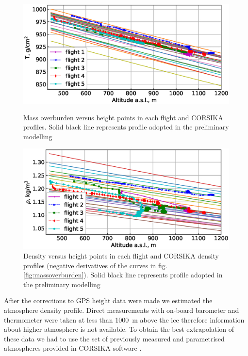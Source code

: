 \documentclass[final,5p,times,twocolumn]{elsarticle}
\begin{document}
\begin{figure}[bt]
\centering
\begin{minipage}[t]{0.48\textwidth}
\includegraphics[width=\textwidth]{figs/atmosphere_T.eps}
\vspace{-1.0pc}
\caption{Mass overburden versus height points in each flight and CORSIKA profiles. Solid black line represents profile adopted in the preliminary modelling}
\label{fig:massoverburden}
\end{minipage}
\vfill
\vspace{1pc}
\begin{minipage}[t]{0.48\textwidth}
\includegraphics[width=\textwidth]{figs/atmosphere_rho.eps}
\vspace{-1.0pc}
\caption{Density versus height points in each flight and CORSIKA density profiles (negative derivatives of the curves in fig. \ref{fig:massoverburden}). Solid black line represents profile adopted in the preliminary modelling}
\label{fig:density}
\end{minipage}
\end{figure}


After the corrections to GPS height data were made we estimated the atmosphere density profile. Direct measurements with on-board barometer and thermometer were taken at less than 1000~m above the ice therefore information about higher atmosphere is not available. To obtain the best extrapolation of these data we had to use the set of previously measured and parametrised atmospheres provided in CORSIKA software \cite{hec98}.
\end{document}

